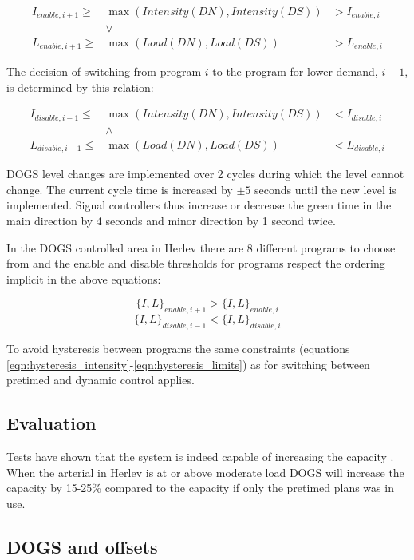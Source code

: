 \begin{eqnarray*}
I_{enable,i+1} \geq & \max(Intensity(DN),Intensity(DS)) & > I_{enable,i} \\
& \vee & \\
L_{enable,i+1} \geq & \max(Load(DN),Load(DS))  & > L_{enable,i}
\end{eqnarray*}

The decision of switching from program $i$ to the program for lower demand, $i-1$, is determined by this relation:

\begin{eqnarray*}
I_{disable,i-1} \leq & \max(Intensity(DN),Intensity(DS)) & < I_{disable,i} \\
& \wedge & \\
L_{disable,i-1} \leq & \max(Load(DN),Load(DS))  & < L_{disable,i}
\end{eqnarray*}

DOGS level changes are implemented over 2 cycles during which the level cannot change. The current cycle time is increased by $\pm 5$ seconds until the new level is implemented. Signal controllers thus increase or decrease the green time in the main direction by 4 seconds and minor direction by 1 second twice.

In the DOGS controlled area in Herlev there are 8 different programs to choose from and the enable and disable thresholds for programs respect the ordering implicit in the above equations:

$$\lbrace I,L \rbrace_{enable,i+1} > \lbrace I,L \rbrace_{enable,i}$$
$$\lbrace I,L \rbrace_{disable,i-1} < \lbrace I,L \rbrace_{disable,i}$$

To avoid hysteresis between programs the same constraints (equations \ref{eqn:hysteresis_intensity}-\ref{eqn:hysteresis_limits}) as for switching between pretimed and dynamic control applies.

\subsection{Evaluation}
Tests have shown that the system is indeed capable of increasing the capacity \cite{dogs}. When the arterial in Herlev is at or above moderate load DOGS will increase the capacity by 15-25\% compared to the capacity if only the pretimed plans was in use.

\subsection{DOGS and offsets}
\label{dogs_offset}


